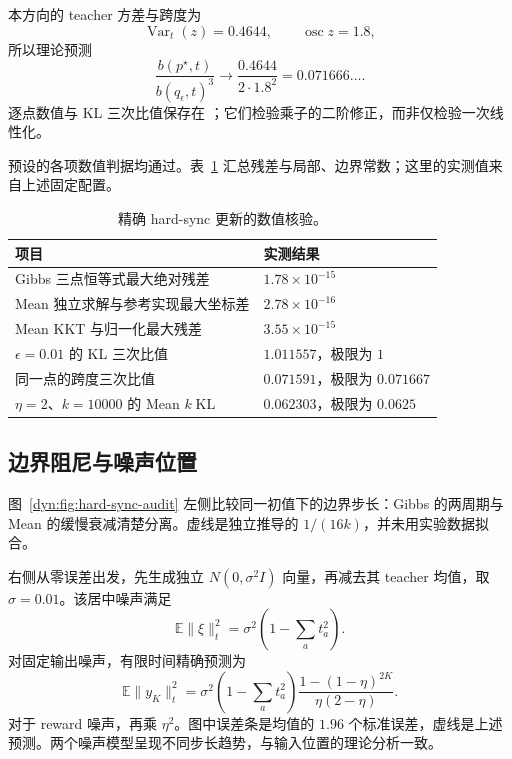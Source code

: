 \documentclass[lang=cn,scheme=chinese,openany]{../book/elegantbook}
\newcommand{\E}{\mathbb E}
\newcommand{\KL}{\operatorname{KL}}
\newcommand{\Var}{\operatorname{Var}}
\begin{document}
本方向的 teacher 方差与跨度为
\begin{equation*}
 \Var_t(z)=0.4644,\qquad \operatorname{osc}z=1.8,
\end{equation*}
所以理论预测
\begin{equation*}
 \frac{b(p^\star,t)}{b(q_\epsilon,t)^3}\to
 \frac{0.4644}{2\cdot1.8^2}=0.071666\ldots.
\end{equation*}
逐点数值与 KL 三次比值保存在 ；它们检验乘子的二阶修正，而非仅检验一次线性化。

预设的各项数值判据均通过。表~\ref{dyn:tab:hard-sync-audit} 汇总残差与局部、边界常数；这里的实测值来自上述固定配置。
\begin{table}[htbp]
 \centering
 \caption{精确 hard-sync 更新的数值核验。}
 \label{dyn:tab:hard-sync-audit}
 \begin{tabular}{ll}
 \toprule
 项目 & 实测结果\\
 \midrule
 Gibbs 三点恒等式最大绝对残差 & $1.78\times10^{-15}$\\
 Mean 独立求解与参考实现最大坐标差 & $2.78\times10^{-16}$\\
 Mean KKT 与归一化最大残差 & $3.55\times10^{-15}$\\
 $\epsilon=0.01$ 的 KL 三次比值 & $1.011557$，极限为 $1$\\
 同一点的跨度三次比值 & $0.071591$，极限为 $0.071667$\\
 $\eta=2$、$k=10000$ 的 Mean $k\KL$ & $0.062303$，极限为 $0.0625$\\
 \bottomrule
 \end{tabular}
\end{table}

\subsection{边界阻尼与噪声位置}

图~\ref{dyn:fig:hard-sync-audit} 左侧比较同一初值下的边界步长：Gibbs 的两周期与 Mean 的缓慢衰减清楚分离。虚线是独立推导的 $1/(16k)$，并未用实验数据拟合。

右侧从零误差出发，先生成独立 $N(0,\sigma^2I)$ 向量，再减去其 teacher 均值，取 $\sigma=0.01$。该居中噪声满足
\begin{equation*}
 \E\|\xi\|_t^2=\sigma^2\left(1-\sum_a t_a^2\right).
\end{equation*}
对固定输出噪声，有限时间精确预测为
\begin{equation*}
 \E\|y_K\|_t^2=
 \sigma^2\left(1-\sum_a t_a^2\right)
 \frac{1-(1-\eta)^{2K}}{\eta(2-\eta)}.
\end{equation*}
对于 reward 噪声，再乘 $\eta^2$。图中误差条是均值的 $1.96$ 个标准误差，虚线是上述预测。两个噪声模型呈现不同步长趋势，与输入位置的理论分析一致。
\end{document}

